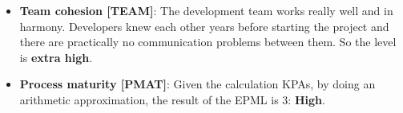 \begin{itemize}
        \item \textbf{Team cohesion [TEAM]}: The development team works really well and in harmony. Developers knew each other years before starting the project and there are practically no communication problems between them. So the level is \textbf{extra high}.
        
        \item \textbf{Process maturity [PMAT]}: Given the calculation KPAs, by doing an arithmetic approximation, the result of the EPML is 3: \textbf{High}.
        
    \end{itemize}
    
